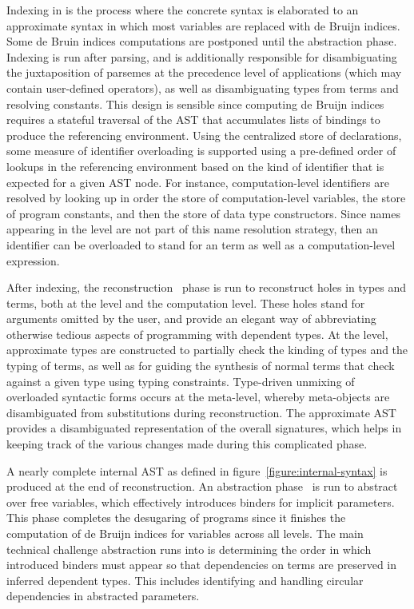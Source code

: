Indexing in \Beluga is the process where the concrete syntax is elaborated to an approximate syntax in which most variables are replaced with de Bruijn indices.
Some de Bruin indices computations are postponed until the abstraction phase.
Indexing is run after parsing, and is additionally responsible for disambiguating the juxtaposition of \LF parsemes at the precedence level of applications (which may contain user-defined operators), as well as disambiguating \LF types from terms and resolving constants.
This design is sensible since computing de Bruijn indices requires a stateful traversal of the \ac{AST} that accumulates lists of bindings to produce the referencing environment.
Using the centralized store of declarations, some measure of identifier overloading is supported using a pre-defined order of lookups in the referencing environment based on the kind of identifier that is expected for a given \ac{AST} node.
For instance, computation-level identifiers are resolved by looking up in order the store of computation-level variables, the store of program constants, and then the store of data type constructors.
Since names appearing in the \LF level are not part of this name resolution strategy, then an identifier can be overloaded to stand for an \LF term as well as a computation-level expression.

After indexing, the reconstruction~\cite{pientka2013insider} phase is run to reconstruct holes in types and terms, both at the \LF level and the computation level.
These holes stand for arguments omitted by the user, and provide an elegant way of abbreviating otherwise tedious aspects of programming with dependent types.
At the \LF level, approximate types are constructed to partially check the kinding of \LF types and the typing of \LF terms, as well as for guiding the synthesis of normal terms that check against a given type using typing constraints.
Type-driven unmixing of overloaded syntactic forms occurs at the meta-level, whereby meta-objects are disambiguated from substitutions during reconstruction.
The approximate \ac{AST} provides a disambiguated representation of the overall \Beluga signatures, which helps in keeping track of the various changes made during this complicated phase.

A nearly complete internal \ac{AST} as defined in figure~\ref{figure:internal-syntax} is produced at the end of reconstruction.
An abstraction phase~\cite{germain2010implementation} is run to abstract over free variables, which effectively introduces binders for implicit parameters.
This phase completes the desugaring of \Beluga programs since it finishes the computation of de Bruijn indices for variables across all levels.
The main technical challenge abstraction runs into is determining the order in which introduced binders must appear so that dependencies on terms are preserved in inferred dependent types.
This includes identifying and handling circular dependencies in abstracted parameters.

